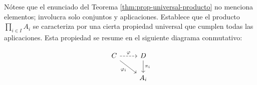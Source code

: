 Nótese que el enunciado del Teorema \ref{thm:prop-universal-producto} no menciona elementos; involucra solo conjuntos y aplicaciones. Establece que el producto $\prod_{i \in I} A_i$ se caracteriza por una cierta propiedad universal que cumplen todas las aplicaciones. Esta propiedad se resume en el siguiente diagrama conmutativo:

\[
    \begin{tikzcd}
    C \arrow[swap]{dr}{\varphi_i} \arrow[dashed]{r}{\varphi} & D \arrow{d}{\pi_i} \\
    & A_i
    \end{tikzcd}
\]